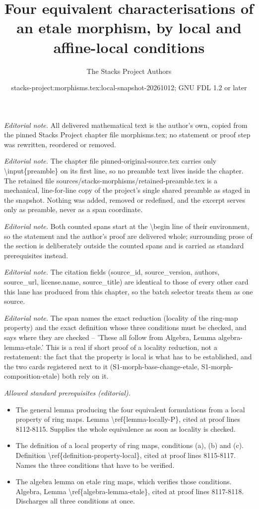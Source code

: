 \documentclass[10pt,a4paper]{amsart}
\title{Four equivalent characterisations of an etale morphism, by local and affine-local conditions}
\author{The Stacks Project Authors}
\date{stacks-project:morphisms.tex:local-snapshot-20261012; GNU FDL 1.2 or later}
\theoremstyle{plain}
\theoremstyle{definition}
\theoremstyle{remark}
\numberwithin{equation}{subsection}
\begin{document}
\maketitle
\setcounter{subsection}{1}
\noindent\textit{Editorial note.} All delivered mathematical text is the author's own, copied from the pinned Stacks Project chapter file morphisms.tex; no statement or proof step was rewritten, reordered or removed.\par\medskip
\noindent\textit{Editorial note.} The chapter file pinned-original-source.tex carries only \textbackslash{}input\{preamble\} on its first line, so no preamble text lives inside the chapter. The retained file sources/stacks-morphisms/retained-preamble.tex is a mechanical, line-for-line copy of the project's single shared preamble as staged in the snapshot. Nothing was added, removed or redefined, and the excerpt serves only as preamble, never as a span coordinate.\par\medskip
\noindent\textit{Editorial note.} Both counted spans start at the \textbackslash{}begin line of their environment, so the statement and the author's proof are delivered whole; surrounding prose of the section is deliberately outside the counted spans and is carried as standard prerequisites instead.\par\medskip
\noindent\textit{Editorial note.} The citation fields (source\_id, source\_version, authors, source\_url, license.name, source\_title) are identical to those of every other card this lane has produced from this chapter, so the batch selector treats them as one source.\par\medskip
\noindent\textit{Editorial note.} The span names the exact reduction (locality of the ring-map property) and the exact definition whose three conditions must be checked, and says where they are checked -- 'These all follow from Algebra, Lemma algebra-lemma-etale.' This is a real if short proof of a locality reduction, not a restatement: the fact that the property is local is what has to be established, and the two cards registered next to it (S1-morph-base-change-etale, S1-morph-composition-etale) both rely on it.\par\medskip
\noindent\textit{Allowed standard prerequisites (editorial).}\begin{itemize}
\item The general lemma producing the four equivalent formulations from a local property of ring maps. Lemma \textbackslash{}ref\{lemma-locally-P\}, cited at proof lines 8112-8115. Supplies the whole equivalence as soon as locality is checked.
\item The definition of a local property of ring maps, conditions (a), (b) and (c). Definition \textbackslash{}ref\{definition-property-local\}, cited at proof lines 8115-8117. Names the three conditions that have to be verified.
\item The algebra lemma on etale ring maps, which verifies those conditions. Algebra, Lemma \textbackslash{}ref\{algebra-lemma-etale\}, cited at proof lines 8117-8118. Discharges all three conditions at once.
\end{itemize}\medskip
\end{document}
